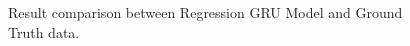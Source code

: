 \begin{figure}[H]
\begin{center}
\end{center}
\decoRule
\caption[Result comparison between Regression GRU Model and Ground Truth data]{Result comparison between Regression GRU Model and Ground Truth data.}
\label{fig:regression-gru-results}
\end{figure}
